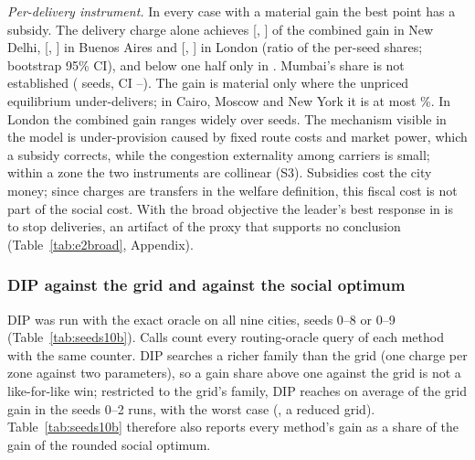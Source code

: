 \documentclass[preprint,12pt]{elsarticle}
\theoremstyle{definition}
\theoremstyle{remark}
\begin{document}
\emph{Per-delivery instrument.} In every case with a material gain the best point has a subsidy. The delivery charge alone achieves \TenShareNewDelhi{} [\TenShareLoNewDelhi, \TenShareHiNewDelhi] of the combined gain in New Delhi, \TenShareBuenosAires{} [\TenShareLoBuenosAires, \TenShareHiBuenosAires] in Buenos Aires and \TenShareLondon{} [\TenShareLoLondon, \TenShareHiLondon] in London (ratio of the per-seed shares; bootstrap 95\% CI), and below one half only in \TenShareBelowHalf. Mumbai's share is not established (\TenShareMumbaiN{} seeds, CI \TenShareMumbaiLo--\TenShareMumbaiHi). The gain is material only where the unpriced equilibrium under-delivers; in Cairo, Moscow and New York it is at most \EtwoSmallMax\%. In London the combined gain ranges widely over seeds. The mechanism visible in the model is under-provision caused by fixed route costs and market power, which a subsidy corrects, while the congestion externality among carriers is small; within a zone the two instruments are collinear (S3). Subsidies cost the city money; since charges are transfers in the welfare definition, this fiscal cost is not part of the social cost. With the broad objective the leader's best response in \EtwoBroadShutdownCities{} is to stop deliveries, an artifact of the proxy that supports no conclusion (Table~\ref{tab:e2broad}, Appendix).

\subsubsection{DIP against the grid and against the social optimum}\label{sec:res-dip}

DIP was run with the exact oracle on all nine cities, seeds 0--8 or 0--9 (Table~\ref{tab:seeds10b}). Calls count every routing-oracle query of each method with the same counter. DIP searches a richer family than the grid (one charge per zone against two parameters), so a gain share above one against the grid is not a like-for-like win; restricted to the grid's family, DIP reaches on average \DipFamMean{} of the grid gain in the seeds 0--2 runs, with the worst case \DipFamMin{} (\DipFamMinCase, a reduced grid). Table~\ref{tab:seeds10b} therefore also reports every method's gain as a share of the gain of the rounded social optimum.

\begin{table}[tbp]\centering\small
\caption{Leader methods, mean over seeds (exact oracle). DIP / grid: DIP gain over the best exact grid point's gain; calls: DIP's oracle calls as a percentage of a 63-point grid at the same calls per point. Gain shares against the social optimum (SO): best grid point, DIP, ARP flat; ARP / DIP gain ratio; $n_{\rm ARP}$ seeds with an ARP run. $^*$: reduced exact grid (lower bounds for the grid column). Shares are not reported where the optimum's gain is below 0.5\% of $|$social cost$|$.}\label{tab:seeds10b}
\end{table}
\end{document}
